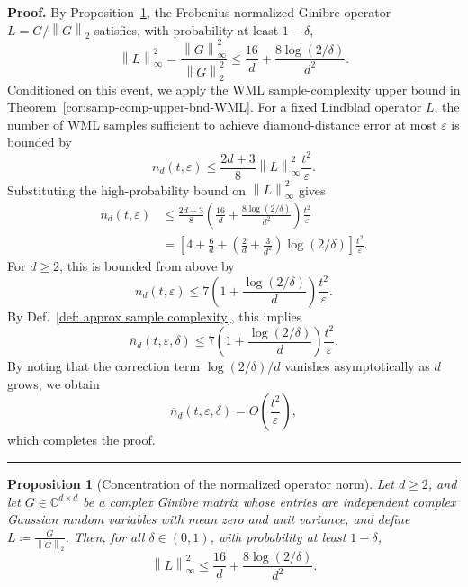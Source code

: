 \documentclass[superscriptaddress,amsmath,amssymb,aps,pra,letterpaper,tightenlines,notitlepages,12pt]{revtex4-2}
\newtheorem{proposition}[theorem]{Proposition}
\newenvironment{proof}[1][Proof]{\noindent\textbf{#1.} }{\ \rule{0.5em}{0.5em}}
\begin{document}
\begin{proof}
By Proposition~\ref{prop:concentration}, the Frobenius-normalized Ginibre operator $L=G/\left\|G\right\|_2$ satisfies, with probability at least $1-\delta$,
\begin{equation}
    \left\|L\right\|_\infty^2 = \frac{\left\|G\right\|_\infty^2}{\left\|G\right\|_2^2}
    \le \frac{16}{d} + \frac{8\log(2/\delta)}{d^2}.
\end{equation}
Conditioned on this event, we apply the WML sample-complexity upper bound in Theorem~\ref{cor:samp-comp-upper-bnd-WML}. 
For a fixed Lindblad operator $L$, the number of WML samples sufficient to achieve diamond-distance error at most $\varepsilon$ is bounded by
\begin{equation}
    n_d(t,\varepsilon) \le \frac{2d+3}{8}
    \left\|L\right\|_\infty^2 \frac{t^2}{\varepsilon}.
\end{equation}
Substituting the high-probability bound on $\left\|L\right\|_\infty^2$ gives
\begin{align}
    n_d(t,\varepsilon)
    &\le \frac{2d+3}{8} \left(\frac{16}{d} + \frac{8\log(2/\delta)}{d^2}\right)\frac{t^2}{\varepsilon} \\
    & = \left[4+\frac{6}{d}+\left(\frac{2}{d}+\frac{3}{d^2}\right)\log(2/\delta)\right]\frac{t^2}{\varepsilon}.
\end{align}
For $d\ge 2$, this is bounded from above by
\begin{equation}
    n_d(t,\varepsilon)\le 7\left(1+\frac{\log(2/\delta)}{d}\right)\frac{t^2}{\varepsilon}.
\end{equation}
By Def.~\ref{def: approx sample complexity}, this implies
\begin{equation}
    \overline{n}_d(t,\varepsilon,\delta)\le 7\left(1+\frac{\log(2/\delta)}{d}\right)\frac{t^2}{\varepsilon}.
\end{equation}
By noting that the correction term $\log(2/\delta)/d$ vanishes asymptotically as $d$ grows, we obtain
\begin{equation}
    \overline{n}_d(t,\varepsilon,\delta) = O\!\left(\frac{t^2}{\varepsilon}\right),
\end{equation}
which completes the proof.
\end{proof}

\begin{proposition}[Concentration of the normalized operator norm]
\label{prop:concentration}
Let $d\ge 2$, and let $G \in \mathbb{C}^{d \times d}$ be a complex Ginibre matrix whose entries are independent complex Gaussian random variables with mean zero and unit variance, and define $L \coloneqq \frac{G}{\left\|G\right\|_2}$.
Then, for all $\delta \in (0,1)$, with probability at least $1-\delta$,
\begin{equation}
    \left\|L\right\|_\infty^2 \le \frac{16}{d} + \frac{8\log(2/\delta)}{d^2}.
\end{equation}
\end{proposition}
\end{document}
